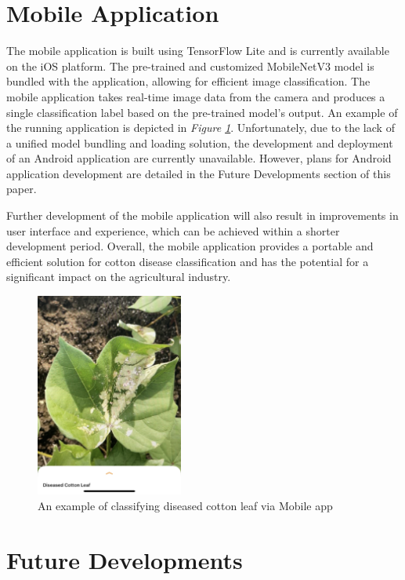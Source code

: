 \documentclass[conference]{IEEEtran}
\begin{document}
\section{Mobile Application}
The mobile application is built using TensorFlow Lite and is currently available on the iOS platform. The pre-trained and customized MobileNetV3 model is bundled with the application, allowing for efficient image classification. The mobile application takes real-time image data from the camera and produces a single classification label based on the pre-trained model's output. An example of the running application is depicted in \emph{Figure \ref{DiseasedCottonLeaf}}. Unfortunately, due to the lack of a unified model bundling and loading solution, the development and deployment of an Android application are currently unavailable. However, plans for Android application development are detailed in the Future Developments section of this paper.

Further development of the mobile application will also result in improvements in user interface and experience, which can be achieved within a shorter development period. Overall, the mobile application provides a portable and efficient solution for cotton disease classification and has the potential for a significant impact on the agricultural industry.

\begin{figure}[h]
\centerline{\includegraphics[height=6.7cm, width = 6cm \linewidth]{Images/Diseased Cotton Leaf.png}}
\caption{An example of classifying diseased cotton leaf via Mobile app }
\label{DiseasedCottonLeaf}
\end{figure}

\section{Future Developments}
\end{document}
